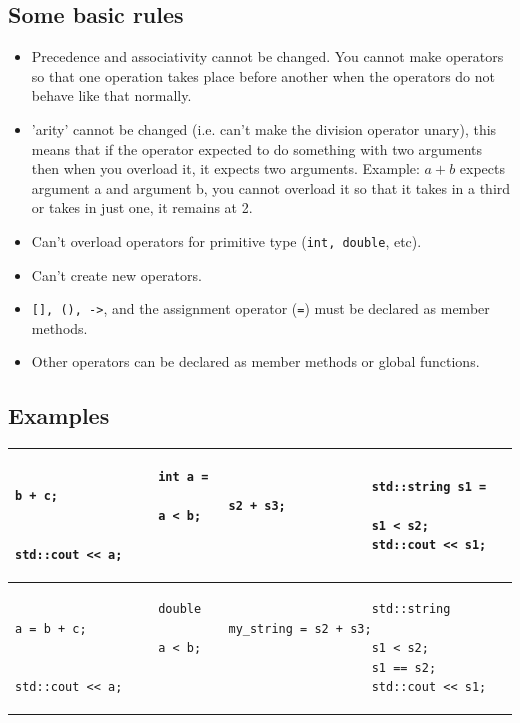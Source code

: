 \subsection{Some basic rules}
\begin{itemize}
    \item Precedence and associativity cannot be changed. You cannot make operators so that one operation takes place before another when the operators do not behave like that normally.
    \item 'arity' cannot be changed (i.e. can't make the division operator unary), this means that if the operator expected to do something with two arguments then when you overload it, it expects two arguments. Example: $a + b$ expects argument a and argument b, you cannot overload it so that it takes in a third or takes in just one, it remains at 2.
    \item Can't overload operators for primitive type (\texttt{int, double}, etc).
    \item Can't create new operators.
    \item \texttt{[], (), ->}, and the assignment operator (\texttt{=}) must be declared as member methods.
    \item Other operators can be declared as member methods or global functions.
\end{itemize}

\subsection{Examples}
\begin{center}
    \begin{tabular}{ |p{5cm}|p{6cm}| }
        \hline
            {
                \begin{verbatim}
                    int a = b + c;
                    a < b;
                    std::cout << a;
                \end{verbatim}
            } &
            {
                \begin{verbatim}
                    std::string s1 = s2 + s3;
                    s1 < s2;
                    std::cout << s1;
                \end{verbatim}
            } \\
        \hline
            {
                \begin{verbatim}
                    double a = b + c;
                    a < b;
                    std::cout << a;
                \end{verbatim}
            } & 
            {
                \begin{verbatim}
                    std::string my_string = s2 + s3;
                    s1 < s2;
                    s1 == s2;
                    std::cout << s1;
                \end{verbatim}
            } \\
        \hline
        \end{tabular}
\end{center}

